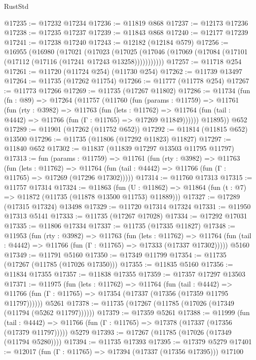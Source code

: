 \begin{lexlean}{RustStd}
\begin{coremodule}
@17235 := @17232 @17234
@17236 := @11819 @868
@17237 := @12173 @17236
@17238 := @17235 @17237
@17239 := @11843 @868
@17240 := @12177 @17239
@17241 := @17238 @17240
@17243 := @12182 (@12184 @579)
@17256 := @16955
    (@16980
      (@17021
        (@17023
          (@17025 (@17046 (@17069 (@17084 (@17101 (@17112 (@17116 (@17241 @17243 @13258)))))))))))
@17257 := @11718 @254
@17261 := @11720 (@11724 @254) (@11730 @254)
@17262 := @11739 @13497
@17264 := @11735 (@17262 @11754)
@17266 := @11777 (@11778 @254)
@17267 := @11773 @17266
@17269 := @11735 (@17267 @11802)
@17286 := @11734
    (fun (fn : @89) =>
    @17264
      (@11757
        (@11760
          (fun (params : @11759) =>
          @11761
            (fun (rty : @3982) =>
            @11763
              (fun (lets : @11762) =>
              @11764 (fun (tail : @4442) => @11766 (fun (Γ : @11765) => @17269 @11849))))))
        @11895))
    @652
@17289 := @11901 (@17262 (@11752 @652))
@17292 := @11814 (@11815 @652) @13500
@17296 := @11735 (@11806 (@17292 @11823) @11827)
@17297 := @11840 @652
@17302 := @11837 (@11839 @17297 @13503 @11795 @11797)
@17313 := fun (params : @11759) =>
  @11761
    (fun (rty : @3982) =>
    @11763
      (fun (lets : @11762) =>
      @11764 (fun (tail : @4442) => @11766 (fun (Γ : @11765) => @17269 (@17296 @17302)))))
@17314 := @11760 @17313
@17315 := @11757 @17314
@17324 := @11863
    (fun (U : @11862) => @11864 (fun (t : @7) => @11872 (@11735 (@11878 @13500 @11753) @11889)))
@17327 := @17289 (@17315 @17324) @13498
@17329 := @11720 @17314 @17324
@17331 := @11950 @17313 @5141
@17333 := @11735 (@17267 @17028)
@17334 := @17292 @17031
@17335 := @11806 @17334
@17337 := @11735 (@17335 @11827)
@17348 := @11953
    (fun (rty : @3982) =>
    @11763
      (fun (lets : @11762) =>
      @11764 (fun (tail : @4442) => @11766 (fun (Γ : @11765) => @17333 (@17337 @17302)))))
    @5160
@17349 := @11791 @5160
@17350 := @17349 @11799
@17354 := @11735 (@17267 (@11785 (@17026 @17350)))
@17355 := @11835 @5160
@17356 := @11834 @17355
@17357 := @11838 @17355
@17359 := @17357 @17297 @13503
@17371 := @11975
    (fun (lets : @11762) =>
    @11764
      (fun (tail : @4442) =>
      @11766 (fun (Γ : @11765) => @17354 (@17337 (@17356 (@17359 @11795 @11797))))))
    @5261
@17378 := @11735 (@17267 (@11785 (@17026 (@17349 (@11794 (@5262 @11797))))))
@17379 := @17359 @5261
@17388 := @11999
    (fun (tail : @4442) => @11766 (fun (Γ : @11765) => @17378 (@17337 (@17356 (@17379 @11797)))))
    @5279
@17393 := @17267 (@11785 (@17026 (@17349 (@11794 @5280))))
@17394 := @11735 @17393
@17395 := @17379 @5279
@17401 := @12017 (fun (Γ : @11765) => @17394 (@17337 (@17356 @17395))) @17100

\end{coremodule}
\end{lexlean}
